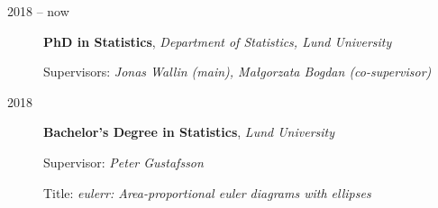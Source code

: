 \documentclass[
  10pt,
  headsepline=true,
  english,
  DIV=12
]{scrartcl}
\renewcommand*{%
  \mkbibnamegiven
}[1]{\ifitemannotation{highlight}{\textbf{#1}}{#1}}
\renewcommand*{%
  \mkbibnamefamily
}[1]{\ifitemannotation{highlight}{\textbf{#1}}{#1}}
\begin{document}
\begin{description}
  \item[2018 -- now] {
    \textbf{PhD in Statistics}, \emph{Department of Statistics, Lund
      University}

      Supervisors: \emph{Jonas Wallin (main), Małgorzata Bogdan (co-supervisor)}
    }

  \item[2018] {
    \textbf{Bachelor's Degree in Statistics}, \emph{Lund University}

    Supervisor: \emph{Peter Gustafsson}

    Title: \emph{eulerr: Area-proportional euler diagrams with ellipses}
    }






\end{description}





\end{document}

